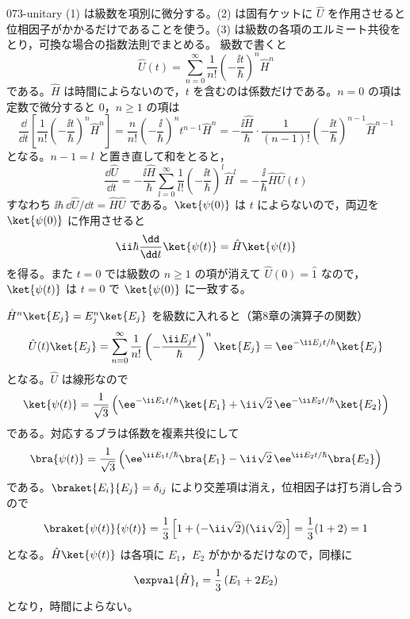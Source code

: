 \documentclass[uplatex,dvipdfmx,a4paper,11pt]{jsarticle}
\begin{document}
\kaitouhen
{}
\begin{kaisetsu}{073-unitary}
\houshin (1) は級数を項別に微分する。(2) は固有ケットに $\hat{U}$ を作用させると位相因子がかかるだけであることを使う。(3) は級数の各項のエルミート共役をとり，可換な場合の指数法則でまとめる。
\keisan {} 級数で書くと
\[ \hat{U}(t)=\sum_{n=0}^{\infty}\frac{1}{n!}\left(-\frac{\ii t}{\hbar}\right)^{n}\hat{H}^{n} \]
である。$\hat{H}$ は時間によらないので，$t$ を含むのは係数だけである。$n=0$ の項は定数で微分すると $0$，$n\ge1$ の項は
\[ \frac{\dd}{\dd t}\left[\frac{1}{n!}\left(-\frac{\ii t}{\hbar}\right)^{n}\hat{H}^{n}\right]=\frac{n}{n!}\left(-\frac{\ii}{\hbar}\right)^{n}t^{n-1}\hat{H}^{n}=-\frac{\ii\hat{H}}{\hbar}\cdot\frac{1}{(n-1)!}\left(-\frac{\ii t}{\hbar}\right)^{n-1}\hat{H}^{n-1} \]
となる。$n-1=l$ と置き直して和をとると，
\[ \frac{\dd\hat{U}}{\dd t}=-\frac{\ii\hat{H}}{\hbar}\sum_{l=0}^{\infty}\frac{1}{l!}\left(-\frac{\ii t}{\hbar}\right)^{l}\hat{H}^{l}=-\frac{\ii}{\hbar}\hat{H}\hat{U}(t) \]
すなわち $\ii\hbar\,\dd\hat{U}/\dd t=\hat{H}\hat{U}$ である。$\ket{\psi(0)}$ は $t$ によらないので，両辺を $\ket{\psi(0)}$ に作用させると
\[ \ii\hbar\frac{\dd}{\dd t}\ket{\psi(t)}=\hat{H}\ket{\psi(t)} \]
を得る。また $t=0$ では級数の $n\ge1$ の項が消えて $\hat{U}(0)=\hat{1}$ なので，$\ket{\psi(t)}$ は $t=0$ で $\ket{\psi(0)}$ に一致する。

 $\hat{H}^{n}\ket{E_{j}}=E_{j}^{n}\ket{E_{j}}$ を級数に入れると（第8章の演算子の関数）
\[ \hat{U}(t)\ket{E_{j}}=\sum_{n=0}^{\infty}\frac{1}{n!}\left(-\frac{\ii E_{j}t}{\hbar}\right)^{n}\ket{E_{j}}=\ee^{-\ii E_{j}t/\hbar}\ket{E_{j}} \]
となる。$\hat{U}$ は線形なので
\[ \ket{\psi(t)}=\frac{1}{\sqrt{3}}\left(\ee^{-\ii E_{1}t/\hbar}\ket{E_{1}}+\ii\sqrt{2}\,\ee^{-\ii E_{2}t/\hbar}\ket{E_{2}}\right) \]
である。対応するブラは係数を複素共役にして
\[ \bra{\psi(t)}=\frac{1}{\sqrt{3}}\left(\ee^{\ii E_{1}t/\hbar}\bra{E_{1}}-\ii\sqrt{2}\,\ee^{\ii E_{2}t/\hbar}\bra{E_{2}}\right) \]
である。$\braket{E_{i}}{E_{j}}=\delta_{ij}$ により交差項は消え，位相因子は打ち消し合うので
\[ \braket{\psi(t)}{\psi(t)}=\frac{1}{3}\left[1+(-\ii\sqrt{2})(\ii\sqrt{2})\right]=\frac{1}{3}(1+2)=1 \]
となる。$\hat{H}\ket{\psi(t)}$ は各項に $E_{1}$，$E_{2}$ がかかるだけなので，同様に
\[ \expval{\hat{H}}_{t}=\frac{1}{3}\left(E_{1}+2E_{2}\right) \]
となり，時間によらない。


\end{kaisetsu}
\end{document}
